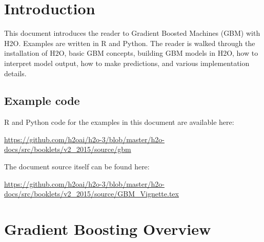 \newpage
\thispagestyle{empty}%

\tableofcontents


\newpage

\section{Introduction}
This document introduces the reader to Gradient Boosted Machines (GBM) with H2O.  
Examples are written in R and Python.
The reader is walked through the installation of H2O, basic GBM concepts, building GBM models in H2O, how to
interpret model output, how to make predictions, and various implementation details.





\newpage

\newcommand{\waterVersion}{3.0.1.4}



\subsection{Example code}

R and Python code for the examples in this document are available here:

\url{https://github.com/h2oai/h2o-3/blob/master/h2o-docs/src/booklets/v2_2015/source/gbm}

The document source itself can be found here:

\url{https://github.com/h2oai/h2o-3/blob/master/h2o-docs/src/booklets/v2_2015/source/GBM_Vignette.tex}

\section{Gradient Boosting Overview}

